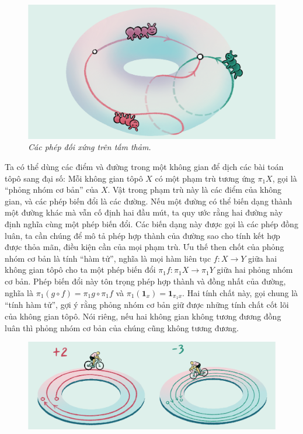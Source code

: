 \begin{multicols}{2}
	\begin{figure}[H]
		\centering
		\vspace*{-5pt}
		\captionsetup{labelformat= empty, justification=centering}
		\includegraphics[width=1\linewidth]{7}
		\caption{\small\textit{\color{duongvaotoanhoc}Các phép đối xứng trên tấm thảm.}}
		\vspace*{-10pt}
	\end{figure}	
	Ta có thể dùng các điểm và đường trong một không gian để dịch các bài toán tôpô sang đại số: Mỗi không gian tôpô $X$ có một phạm trù tương ứng $\pi_1 X$, gọi là ``phỏng nhóm cơ bản'' của $X$. Vật trong phạm trù này là các điểm của không gian, và các phép biến đổi là các đường. Nếu một đường có thể biến dạng thành một đường khác mà vẫn cố định hai đầu mút, ta quy ước rằng hai đường này định nghĩa cùng một phép biến đổi. Các biến dạng này được gọi là các phép đồng luân, ta cần chúng để mô tả phép hợp thành của đường sao cho tính kết hợp được thỏa mãn, điều kiện cần của mọi phạm trù.
	\vskip 0.1cm
	Ưu thế then chốt của phỏng nhóm cơ bản là tính ``hàm tử'', nghĩa là mọi hàm liên tục $f: X \to Y$ giữa hai không gian tôpô cho ta một phép biến đổi $\pi_1 f: \pi_1 X \to \pi_1 Y$ giữa hai phỏng nhóm cơ bản. Phép biến đổi này tôn trọng phép hợp thành và đồng nhất của đường, nghĩa là $\pi_1(g \circ f) = \pi_1 g \circ \pi_1 f$ và $\pi_1(\pmb{1}_x) = \pmb{1}_{\pi_1 x}$. Hai tính chất này, gọi chung là ``tính hàm tử'', gợi ý rằng phỏng nhóm cơ bản giữ được những tính chất cốt lõi của không gian tôpô. Nói riêng, nếu hai không gian không tương đương đồng luân thì phỏng nhóm cơ bản của chúng cũng không tương đương.
	\begin{figure}[H]
		\centering
		\vspace*{-5pt}
		\captionsetup{labelformat= empty, justification=centering}
		\includegraphics[width=1\linewidth]{8}

\end{figure}
\end{multicols}
